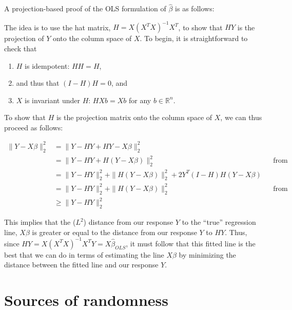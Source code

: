 A projection-based proof of the OLS formulation of $\hat{\beta}$ is as follows:

The idea is to use the hat matrix, $H = X(X^TX)^{-1}X^T$, to show that $HY$ is the projection of $Y$ onto the column space of $X$. To begin, it is straightforward to check that 

\begin{enumerate}
\item $H$ is idempotent: $HH = H$,
\item and thus that $(I - H)H = 0$, and
\item $X$ is invariant under $H$: $HXb = Xb$ for any $b \in \mathbb{R}^n$. 
\end{enumerate}


To show that $H$ is the projection matrix onto the column space of $X$, we can thus proceed as follows:

\begin{align*}
\|Y - X\beta\|_2^2 & = \|Y - HY + HY - X\beta\|_2^2\\
& = \|Y - HY + H(Y - X\beta)\|_2^2 && \text{from (3)}\\
& = \|Y - HY \|_2^2 + \|H(Y - X\beta)\|_2^2 + 2Y^T(I - H)H(Y-X\beta)\\
& = \|Y - HY \|_2^2 + \|H(Y - X\beta)\|_2^2 && \text{from (2)}\\
& \geq \|Y - HY\|_2^2
\end{align*}

This implies that the ($L^2$) distance from our response $Y$ to the ``true'' regression line, $X\beta$ is greater or equal to the distance from our response $Y$ to $HY$. Thus, since $HY = X(X^TX)^{-1}X^TY = X\hat{\beta}_{OLS}$, it must follow that this fitted line is the best that we can do in terms of estimating the line $X\beta$ by minimizing the distance between the fitted line and our response $Y$.

\section{Sources of randomness}

